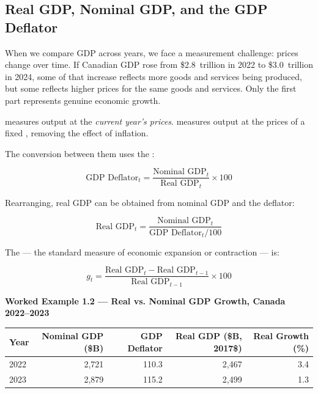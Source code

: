 \subsection{Real GDP, Nominal GDP, and the GDP Deflator}
\label{sec:realgdp}

When we compare GDP across years, we face a measurement challenge: prices
change over time. If Canadian GDP rose from \$2.8~trillion in 2022 to
\$3.0~trillion in 2024, some of that increase reflects more goods and
services being produced, but some reflects higher prices for the same
goods and services. Only the first part represents genuine economic growth.

 measures output at the \textit{current year's prices}.
 measures output at the prices of a fixed ,
removing the effect of inflation.

The conversion between them uses the :

\begin{equation}
  \text{GDP Deflator}_t = \frac{\text{Nominal GDP}_t}{\text{Real GDP}_t} \times 100
  \label{eq:gdp_deflator}
\end{equation}

Rearranging, real GDP can be obtained from nominal GDP and the deflator:

\begin{equation}
  \text{Real GDP}_t = \frac{\text{Nominal GDP}_t}{\text{GDP Deflator}_t / 100}
  \label{eq:real_gdp}
\end{equation}

The  --- the standard measure of economic
expansion or contraction --- is:

\begin{equation}
  g_t = \frac{\text{Real GDP}_t - \text{Real GDP}_{t-1}}{\text{Real GDP}_{t-1}} \times 100
  \label{eq:gdp_growth}
\end{equation}

\noindent\textbf{Worked Example 1.2 --- Real vs. Nominal GDP Growth, Canada 2022--2023}

\begin{center}
\begin{tabular}{lrrrr}
\toprule
Year & Nominal GDP (\$B) & GDP Deflator & Real GDP (\$B, 2017\$) & Real Growth (\%) \\
\midrule
2022 & 2{,}721 & 110.3 & 2{,}467 & 3.4 \\
2023 & 2{,}879 & 115.2 & 2{,}499 & 1.3 \\
\bottomrule
\end{tabular}
\end{center}

